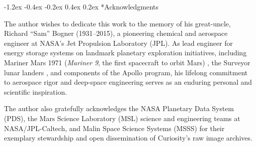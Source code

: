 \documentclass[11pt,a4paper]{article}
\makeatletter
\renewcommand\section{\@startsection {section}{1}{\z@}%
                                   {-1.2ex \@plus -0.4ex \@minus -0.2ex}%
                                   {0.4ex \@plus 0.2ex}%
                                   {\normalfont\large\bfseries}}
\makeatother
\begin{document}
\section*{Acknowledgments}

The author wishes to dedicate this work to the memory of his great-uncle, Richard ``Sam'' Bogner (1931--2015), a pioneering chemical and aerospace engineer at NASA's Jet Propulsion Laboratory (JPL). As lead engineer for energy storage systems on landmark planetary exploration initiatives, including Mariner Mars 1971 (\textit{Mariner 9}, the first spacecraft to orbit Mars) \cite{bogner1973}, the Surveyor lunar landers \cite{bogner1970}, and components of the Apollo program, his lifelong commitment to aerospace rigor and deep-space engineering serves as an enduring personal and scientific inspiration.

The author also gratefully acknowledges the NASA Planetary Data System (PDS), the Mars Science Laboratory (MSL) science and engineering teams at NASA/JPL-Caltech, and Malin Space Science Systems (MSSS) for their exemplary stewardship and open dissemination of Curiosity's raw image archives.
\end{document}
